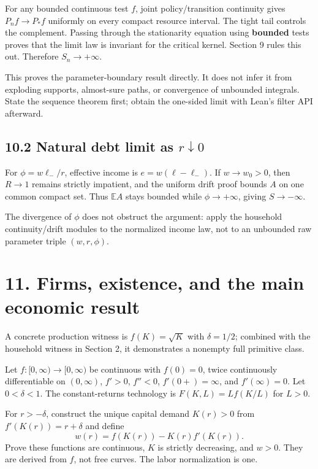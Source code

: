 \documentclass[
  11pt,
]{article}
\begin{document}
For any bounded continuous test \(f\), joint policy/transition
continuity gives \(P_nf\to P_*f\) uniformly on every compact resource
interval. The tight tail controls the complement. Passing through the
stationarity equation using \textbf{bounded} tests proves that the limit
law is invariant for the critical kernel. Section 9 rules this out.
Therefore \(S_n\to+\infty\).

This proves the parameter-boundary result directly. It does not infer it
from exploding supports, almost-sure paths, or convergence of unbounded
integrals. State the sequence theorem first; obtain the one-sided limit
with Lean's filter API afterward.

\subsection{\texorpdfstring{10.2 Natural debt limit as
\(r\downarrow0\)}{10.2 Natural debt limit as r\textbackslash downarrow0}}\label{natural-debt-limit-as-rdownarrow0}

For \(\phi=w\ell_-/r\), effective income is \(e=w(\ell-\ell_-)\). If
\(w\to w_0>0\), then \(R\to1\) remains strictly impatient, and the
uniform drift proof bounds \(A\) on one common compact set. Thus
\(\mathbb EA\) stays bounded while \(\phi\to+\infty\), giving
\(S\to-\infty\).

The divergence of \(\phi\) does not obstruct the argument: apply the
household continuity/drift modules to the normalized income law, not to
an unbounded raw parameter triple \((w,r,\phi)\).

\section{11. Firms, existence, and the main economic
result}\label{firms-existence-and-the-main-economic-result}

A concrete production witness is \(f(K)=\sqrt K\) with \(\delta=1/2\);
combined with the household witness in Section 2, it demonstrates a
nonempty full primitive class.

Let \(f:[0,\infty)\to[0,\infty)\) be continuous with \(f(0)=0\), twice
continuously differentiable on \((0,\infty)\), \(f'>0\), \(f''<0\),
\(f'(0+)=\infty\), and \(f'(\infty)=0\). Let \(0<\delta<1\). The
constant-returns technology is \(F(K,L)=Lf(K/L)\) for \(L>0\).

For \(r>-\delta\), construct the unique capital demand \(K(r)>0\) from
\(f'(K(r))=r+\delta\) and define \[
w(r)=f(K(r))-K(r)f'(K(r)).
\] Prove these functions are continuous, \(K\) is strictly decreasing,
and \(w>0\). They are derived from \(f\), not free curves. The labor
normalization is one.
\end{document}
